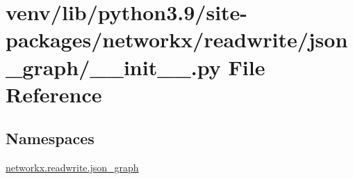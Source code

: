 \hypertarget{venv_2lib_2python3_89_2site-packages_2networkx_2readwrite_2json__graph_2____init_____8py}{}\section{venv/lib/python3.9/site-\/packages/networkx/readwrite/json\+\_\+graph/\+\_\+\+\_\+init\+\_\+\+\_\+.py File Reference}
\label{venv_2lib_2python3_89_2site-packages_2networkx_2readwrite_2json__graph_2____init_____8py}
\subsection*{Namespaces}
\begin{DoxyCompactItemize}
\item 
 \hyperlink{namespacenetworkx_1_1readwrite_1_1json__graph}{networkx.\+readwrite.\+json\+\_\+graph}
\end{DoxyCompactItemize}
